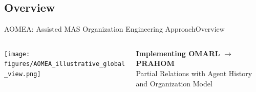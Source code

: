


\subsection{Overview}

\begin{frame}{AOMEA: Assisted MAS Organization Engineering Approach}{Overview}

    \begin{columns}

        \hspace{-7ex}
        \begin{column}{0.5\textwidth}

            \centering
            \vspace{-23.5ex}
            \texttt{[image: figures/AOMEA\_illustrative\_global\_view.png]}

        \end{column}

        \hspace{-5ex}
        \begin{column}{0.5\textwidth}
            {\small \textbf{Implementing OMARL} $\rightarrow$ \textbf{PRAHOM} \\ { \footnotesize Partial Relations with Agent History and Organization Model}}


\end{column}
\end{columns}
\end{frame}
